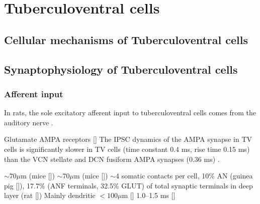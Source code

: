 \section{Tuberculoventral cells}



\subsection{Cellular mechanisms of Tuberculoventral cells}

\subsection{Synaptophysiology of Tuberculoventral cells}

\subsubsection{Afferent input}

In rats, the sole excitatory afferent input to tuberculoventral cells comes from
the auditory nerve \citep{RubioJuiz:2004}.


Glutamate AMPA receptors []                          
The IPSC dynamics of the AMPA synapse in TV cells is significantly slower in TV cells (time constant 0.4 ms, rise time 0.15 ms) than the VCN stellate and DCN fusiform AMPA synapses (0.36 ms)  \citep{GardnerTrussellEtAl:1999}.


$\sim$70$\mu$m (mice [])
$\sim$70$\mu$m (mice [])
$\sim$4 somatic contacts per cell, 10\% AN (guinea pig []), 
17.7\% (ANF terminals, 32.5\% GLUT) of total synaptic terminals in deep layer (rat [])
Mainly dendritic {$<{}100\mu$}m []
1.0--1.5 ms []


\citep{RubioJuiz:2004}


